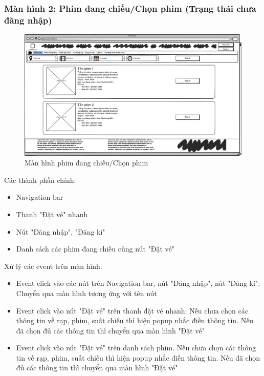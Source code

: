 \documentclass[a4paper, 12pt]{article}
\begin{document}
		\subsubsection{Màn hình 2: Phim đang chiếu/Chọn phim (Trạng thái chưa đăng nhập)}
			\begin{figure}[H]
				\begin{center}
					\includegraphics[scale = 0.25]{Wireframe/User/Phim đang chiếu_ Chọn phim.png}
					\caption{Màn hình phim đang chiếu/Chọn phim}
				\end{center}
			\end{figure}
			Các thành phần chính: 
			\begin{itemize}
				\item Navigation bar
				\item Thanh "Đặt vé" nhanh
				\item Nút "Đăng nhập", "Đăng kí"
				\item Danh sách các phim đang chiếu cùng nút "Đặt vé"
			\end{itemize}
			Xử lý các event trên màn hình:
			\begin{itemize}
				\item Event click vào các nút trên Navigation bar, nút "Đăng nhập", nút "Đăng kí": Chuyển qua màn hình tương ứng với tên nút
				\item Event click vào nút "Đặt vé" trên thanh đặt vé nhanh: Nếu chưa chọn các thông tin về rạp, phim, suất chiếu thì hiện popup nhắc điền thông tin. Nếu đã chọn đủ các thông tin thì chuyển qua màn hình "Đặt vé"
				\item Event click vào nút "Đặt vé" trên danh sách phim. Nếu chưa chọn các thông tin về rạp, phim, suất chiếu thì hiện popup nhắc điền thông tin. Nếu đã chọn đủ các thông tin thì chuyển qua màn hình "Đặt vé"
			\end{itemize}
\end{document}
